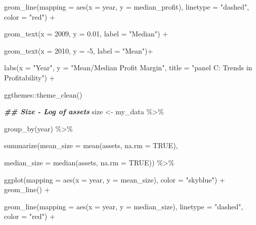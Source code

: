 \documentclass[a4paper,nobind]{templates/ociamthesis}
\newenvironment{Shaded}{\begin{snugshade}}{\end{snugshade}}
\newcommand{\AttributeTok}[1]{\textcolor[rgb]{0.77,0.63,0.00}{#1}}
\newcommand{\ConstantTok}[1]{\textcolor[rgb]{0.00,0.00,0.00}{#1}}
\newcommand{\DecValTok}[1]{\textcolor[rgb]{0.00,0.00,0.81}{#1}}
\newcommand{\DocumentationTok}[1]{\textcolor[rgb]{0.56,0.35,0.01}{\textbf{\textit{#1}}}}
\newcommand{\FloatTok}[1]{\textcolor[rgb]{0.00,0.00,0.81}{#1}}
\newcommand{\FunctionTok}[1]{\textcolor[rgb]{0.00,0.00,0.00}{#1}}
\newcommand{\NormalTok}[1]{#1}
\newcommand{\OtherTok}[1]{\textcolor[rgb]{0.56,0.35,0.01}{#1}}
\newcommand{\SpecialCharTok}[1]{\textcolor[rgb]{0.00,0.00,0.00}{#1}}
\newcommand{\StringTok}[1]{\textcolor[rgb]{0.31,0.60,0.02}{#1}}
\renewenvironment{Shaded}
{
  \vspace{10pt}%
  \begin{snugshade}%
}{%
  \end{snugshade}%
  \vspace{8pt}%
}
\begin{document}
\begin{Shaded}
\begin{Highlighting}[]
  \FunctionTok{geom\_line}\NormalTok{(}\AttributeTok{mapping =} \FunctionTok{aes}\NormalTok{(}\AttributeTok{x =}\NormalTok{ year, }\AttributeTok{y =}\NormalTok{ median\_profit), }\AttributeTok{linetype =} \StringTok{"dashed"}\NormalTok{, }\AttributeTok{color =} \StringTok{"red"}\NormalTok{) }\SpecialCharTok{+}
  
  \FunctionTok{geom\_text}\NormalTok{(}\AttributeTok{x =} \DecValTok{2009}\NormalTok{, }\AttributeTok{y =} \FloatTok{0.01}\NormalTok{, }\AttributeTok{label =} \StringTok{"Median"}\NormalTok{) }\SpecialCharTok{+} 
  
  \FunctionTok{geom\_text}\NormalTok{(}\AttributeTok{x =} \DecValTok{2010}\NormalTok{, }\AttributeTok{y =} \SpecialCharTok{{-}}\DecValTok{5}\NormalTok{, }\AttributeTok{label =} \StringTok{"Mean"}\NormalTok{)}\SpecialCharTok{+}
  
  \FunctionTok{labs}\NormalTok{(}\AttributeTok{x =} \StringTok{"Year"}\NormalTok{, }\AttributeTok{y =} \StringTok{"Mean/Median Profit Margin"}\NormalTok{, }\AttributeTok{title =} \StringTok{"panel C: Trends in Profitability"}\NormalTok{) }\SpecialCharTok{+} 
  
\NormalTok{  ggthemes}\SpecialCharTok{::}\FunctionTok{theme\_clean}\NormalTok{()}

\DocumentationTok{\#\# Size {-} Log of assets}
\NormalTok{size }\OtherTok{\textless{}{-}}\NormalTok{ my\_data }\SpecialCharTok{\%\textgreater{}\%} 
  
  \FunctionTok{group\_by}\NormalTok{(year) }\SpecialCharTok{\%\textgreater{}\%} 
  
  \FunctionTok{summarize}\NormalTok{(}\AttributeTok{mean\_size =} \FunctionTok{mean}\NormalTok{(assets, }\AttributeTok{na.rm =} \ConstantTok{TRUE}\NormalTok{), }
                               
  \AttributeTok{median\_size =} \FunctionTok{median}\NormalTok{(assets, }\AttributeTok{na.rm =} \ConstantTok{TRUE}\NormalTok{)) }\SpecialCharTok{\%\textgreater{}\%} 
  
  \FunctionTok{ggplot}\NormalTok{(}\AttributeTok{mapping =} \FunctionTok{aes}\NormalTok{(}\AttributeTok{x =}\NormalTok{ year, }\AttributeTok{y =}\NormalTok{ mean\_size), }\AttributeTok{color =} \StringTok{"skyblue"}\NormalTok{) }\SpecialCharTok{+} \FunctionTok{geom\_line}\NormalTok{() }\SpecialCharTok{+}
  
  \FunctionTok{geom\_line}\NormalTok{(}\AttributeTok{mapping =} \FunctionTok{aes}\NormalTok{(}\AttributeTok{x =}\NormalTok{ year, }\AttributeTok{y =}\NormalTok{ median\_size), }\AttributeTok{linetype =} \StringTok{"dashed"}\NormalTok{, }\AttributeTok{color =} \StringTok{"red"}\NormalTok{) }\SpecialCharTok{+}
  

\end{Highlighting}
\end{Shaded}
\end{document}
